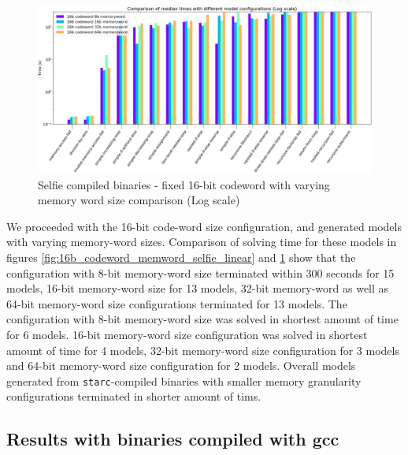 \documentclass[12pt]{article}
\begin{document}
\begin{figure}[!h]
    \includegraphics[width=\linewidth]{assets/benches/16b_codeword_memword_selfie_log.png}
    \centering
    \caption{
        Selfie compiled binaries - fixed 16-bit codeword with varying memory word size comparison (Log scale)
    }
    \label{fig:16b_codeword_memword_selfie_log}
\end{figure}

We proceeded with the 16-bit code-word size configuration, and generated models
with varying memory-word sizes. Comparison of solving time for these models in
figures \ref{fig:16b_codeword_memword_selfie_linear} and
\ref{fig:16b_codeword_memword_selfie_log} show that the configuration with
8-bit memory-word size terminated within 300 seconds for 15 models, 16-bit
memory-word size for 13 models, 32-bit memory-word as well as 64-bit
memory-word size configurations terminated for 13 models. The configuration
with 8-bit memory-word size was solved in shortest amount of time for 6 models.
16-bit memory-word size configuration was solved in shortest amount of time for
4 models, 32-bit memory-word size configuration for 3 models and 64-bit
memory-word size configuration for 2 models. Overall models generated from
\texttt{starc}-compiled binaries with smaller memory granularity configurations
terminated in shorter amount of tims.

\subsection{Results with binaries compiled with gcc}
\end{document}
